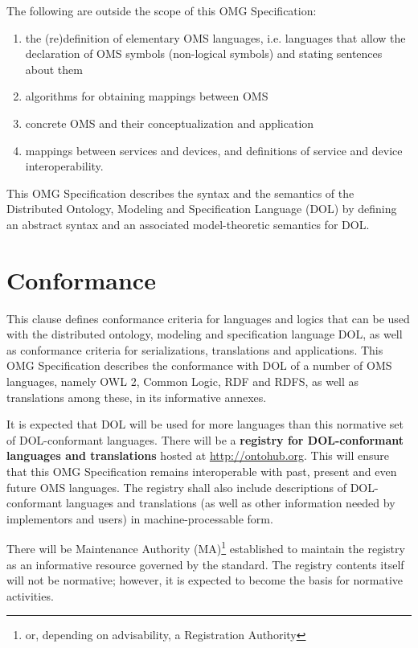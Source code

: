 \documentclass[10pt,%
\ifpretendfinal
final%
\else
draft%
\fi,
]{scrreprt}
\makeatletter
\newcommand*{\ie}{i.e.\@\xspace}
\newcommand*\CommentAuthor{}
\renewcommand*\CommentAuthor{#1}}
\newcommand*\CommentDate{}
\renewcommand*\CommentDate{#1}}
\newcommand*\CommentId{}
\renewcommand*\CommentId{#1}}
\newcommand*\CommentType{}
\renewcommand*\CommentType{#1}}
\newcommand*{\SetCommentColorByType}[1]{%
\edef\localType{{#1}}%
\expandafter\ifstrequal\localType{q-aut}{\colorlet{CommentColor}{red}}{%
\expandafter\ifstrequal\localType{q-all}{\colorlet{CommentColor}{orange}}{%
\expandafter\ifstrequal\localType{todo}{\colorlet{CommentColor}{orange}}{%
\expandafter\ifstrequal\localType{fyi}{\colorlet{CommentColor}{lightgray}}{%
\colorlet{CommentColor}{yellow}}}}}}
\newcommand*{\SetCommentPrefixByType}[1]{%
\edef\localType{{#1}}%
\expandafter\@ifmtarg\localType{%
\edef\CommentPrefix{}%
}{%
\caseupper[q]{#1}%
\edef\CommentPrefix{\thestring: }%
}}
\newcommand*{\initComment}[1]{%
\setkeys{Comment}{#1}%
\SetCommentColorByType{\CommentType}%
\relax%
\SetCommentPrefixByType{\CommentType}%
\relax%
}
\newcommand*{\todonote}[2][]{%
\initComment{#1}%
\pdfcomment[author=\CommentAuthor,color=CommentColor,date=\CommentDate,id=\CommentId]{%
\CommentPrefix
#2}}
\renewcommand*{\todonote}[2][]{%
\initComment{#1}%
\ednote{\CommentPrefix #2}}
\newcommand*{\IS}{OMG Specification\xspace}
\makeatother
\begin{document}
The following are outside the scope of this \IS:
\begin{enumerate}
\item the (re)definition of elementary OMS languages, \ie languages that allow the declaration of OMS symbols (non-logical symbols) 
and
stating sentences about them
\item algorithms for obtaining mappings between OMS
\item concrete OMS and their conceptualization and application
\item mappings between services and devices, and definitions of service and device interoperability.
\end{enumerate}

This \IS describes the syntax and the semantics of the Distributed Ontology, Modeling and Specification Language (DOL) by defining an abstract syntax and an associated model-theoretic semantics for DOL. 


\chapter{Conformance}

This clause defines conformance criteria for languages and logics that
can be used with the distributed ontology, modeling and specification language
 DOL, as well as
conformance criteria for serializations, translations and
applications. This \IS describes the conformance
with DOL of a number of OMS languages, namely OWL 2, Common
Logic, RDF and RDFS, as well as translations among these, in its
informative annexes.

It is expected that DOL will be used for more languages than this
normative set of DOL-conformant languages. There will be a
\textbf{registry for DOL-conformant languages and translations} hosted
at \url{http://ontohub.org}.  This will ensure that this 
\IS remains interoperable with past, present and even future OMS
languages.  The
registry shall also include descriptions of DOL-conformant languages
and translations (as well as other information needed by implementors
and users) in machine-processable form.  

There will be Maintenance Authority (MA)\footnote{ or, depending on
  advisability, a Registration Authority} established to maintain the
registry as an informative resource governed by the standard.  The
registry contents itself will not be normative; however, it is
expected to become the basis for normative activities.
\end{document}
